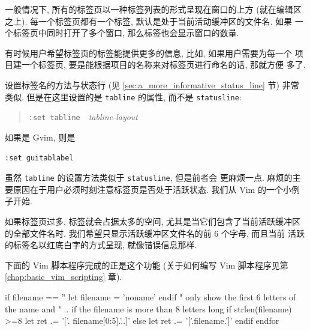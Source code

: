 \begin{warning}
一般情况下, 所有的标签页以一种标签列表的形式呈现在窗口的上方 (就在编辑区
之上). 每一个标签页都有一个标签, 默认是处于当前活动缓冲区的文件名. 如果 
一个标签页中同时打开了多个窗口, 那么标签也会显示窗口的数量.
\begin{center}
\end{center}
有时候用户希望标签页的标签能提供更多的信息, 比如, 如果用户需要为每一个
项目建一个标签页, 要是能根据项目的名称来对标签页进行命名的话, 那就方便
多了.
\begin{center}
\end{center}
设置标签名的方法与状态行 (见 \ref{sec:a_more_informative_status_line} 节)
非常类似. 但是在这里设置的是 \texttt{tabline} 的属性, 而不是
\texttt{statusline}:
\begin{quotation}
    \texttt{:set tabline}\ \ \textit{tabline-layout}
\end{quotation}
\begin{center}
\end{center}
如果是 Gvim, 则是
\begin{vimcmd}
\texttt{:set guitablabel}
\end{vimcmd}

虽然 \texttt{tabline} 的设置方法类似于 \texttt{statusline}, 但是前者会
更麻烦一点. 麻烦的主要原因在于用户必须时刻注意标签页是否处于活跃状态.
我们从 Vim 的一个小例子开始.

如果标签页过多, 标签就会占据太多的空间, 尤其是当它们包含了当前活跃缓冲区
的全部文件名时. 我们希望只显示活跃缓冲区文件名的前 6 个字母, 而且当前
活跃的标签名以红底白字的方式呈现, 就像错误信息那样.

下面的 Vim 脚本程序完成的正是这个功能 (关于如何编写 Vim 脚本程序见第
\ref{chap:basic_vim_scripting} 章).
\begin{vimscript}
    if filename == ''
      let filename = 'noname'
    endif
    " only show the first 6 letters of the name  and
    " .. if the filename is more than 8 letters long
    if strlen(filename) >=8
        let ret .= '['. filename[0:5].'..]'
    else
         let ret .= '['.filename.']'
    endif
 endfor


\end{vimscript}
\end{warning}
